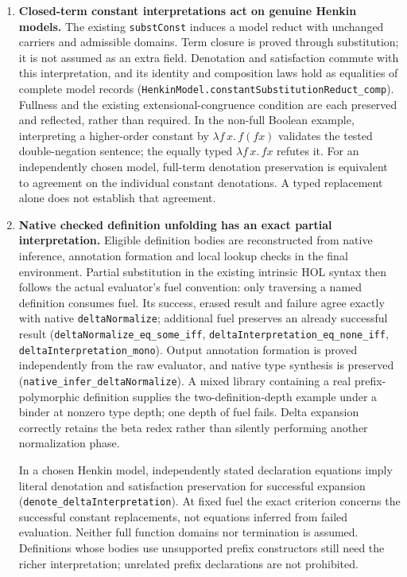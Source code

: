 \documentclass[11pt]{article}
\theoremstyle{definition}
\theoremstyle{remark}
\begin{document}
\begin{enumerate}
  importer or full C realization.
\item \textbf{Closed-term constant interpretations act on genuine Henkin models.}
  The existing \nolinkurl{substConst} induces a model reduct with unchanged
  carriers and admissible domains. Term closure is proved through substitution;
  it is not assumed as an extra field. Denotation and satisfaction commute with
  this interpretation, and its identity and composition laws hold as equalities
  of complete model records
  (\nolinkurl{HenkinModel.constantSubstitutionReduct_comp}). Fullness and the
  existing extensional-congruence condition are each preserved and reflected,
  rather than required. In the non-full Boolean example, interpreting a
  higher-order constant by $\lambda f\,x.\,f(fx)$ validates the tested
  double-negation sentence; the equally typed $\lambda f\,x.\,fx$ refutes it.
  For an independently chosen model, full-term denotation preservation is
  equivalent to agreement on the individual constant denotations. A typed
  replacement alone does not establish that agreement.
\item \textbf{Native checked definition unfolding has an exact partial interpretation.}
  Eligible definition bodies are reconstructed from native inference,
  annotation formation and local lookup checks in the final environment.
  Partial substitution in the existing intrinsic HOL syntax then follows the
  actual evaluator's fuel convention: only traversing a named definition
  consumes fuel. Its success, erased result and failure agree exactly with
  native \nolinkurl{deltaNormalize}; additional fuel preserves an already
  successful result
  (\nolinkurl{deltaNormalize_eq_some_iff},
  \nolinkurl{deltaInterpretation_eq_none_iff},
  \nolinkurl{deltaInterpretation_mono}). Output annotation formation is proved
  independently from the raw evaluator, and native type synthesis is preserved
  (\nolinkurl{native_infer_deltaNormalize}). A mixed library containing a real
  prefix-polymorphic definition supplies the two-definition-depth example
  under a binder at nonzero type depth; one depth of fuel fails. Delta expansion
  correctly retains the beta redex rather than silently performing another
  normalization phase.

  In a chosen Henkin model, independently stated declaration equations imply
  literal denotation and satisfaction preservation for successful expansion
  (\nolinkurl{denote_deltaInterpretation}). At fixed fuel the exact criterion
  concerns the successful constant replacements, not equations inferred from
  failed evaluation. Neither full function domains nor termination is assumed.
  Definitions whose bodies use unsupported prefix constructors still need the
  richer interpretation; unrelated prefix declarations are not prohibited.


\end{enumerate}
\end{document}
